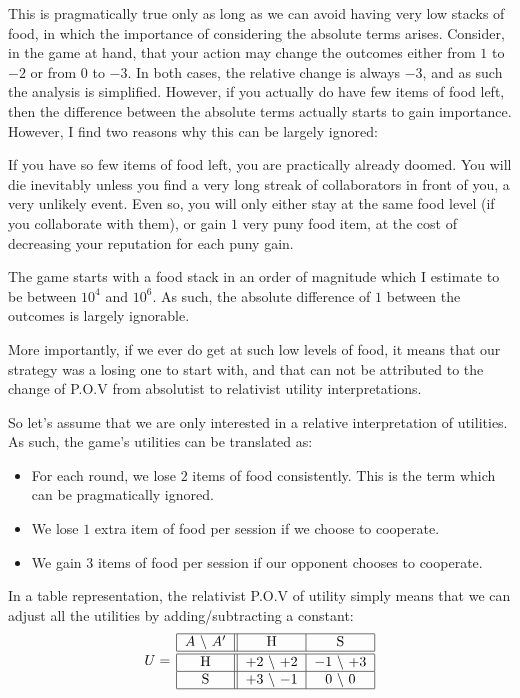 \documentclass[10pt,fleqn]{article}
\begin{document}
This is pragmatically true only as long as we can avoid having very low stacks
of food, in which the importance of considering the absolute terms arises.
Consider, in the game at hand, that your action may change the outcomes either
from $1$ to $-2$ or from $0$ to $-3$. In both cases, the relative change is
always $-3$, and as such the analysis is simplified. However, if you actually do
have few items of food left, then the difference between the absolute terms
actually starts to gain importance. However, I find two reasons why this can be
largely ignored:
\begin{inlist}
  \item If you have so few items of food left, you are practically already
  doomed. You will die inevitably unless you find a very long streak of
  collaborators in front of you, a very unlikely event. Even so, you will only
  either stay at the same food level (if you collaborate with them), or gain $1$
  very puny food item, at the cost of decreasing your reputation for each puny
  gain.
  \item The game starts with a food stack in an order of magnitude which I
  estimate to be between $10^4$ and $10^6$. As such, the absolute difference of
  $1$ between the outcomes is largely ignorable.
  \item More importantly, if we ever do get at such low levels of food, it means
  that our strategy was a losing one to start with, and that can not be
  attributed to the change of P.O.V from absolutist to relativist utility
  interpretations.
\end{inlist}

So let's assume that we are only interested in a relative interpretation of
utilities. As such, the game's utilities can be translated as:
\begin{itemize}
  \item For each round, we lose $2$ items of food consistently. This is the term
  which can be pragmatically ignored.
  \item We lose $1$ extra item of food per session if we choose to cooperate.
  \item We gain $3$ items of food per session if our opponent chooses to
  cooperate.
\end{itemize}

In a table representation, the relativist P.O.V of utility simply means that we
can adjust all the utilities by adding/subtracting a constant:
\begin{equation*}
  U =\,
    \begin{tabular}{|c||c|c|}
      \hline
      $A$ \textbackslash\ $A'$ & H & S \\
      \hline\hline
      H & $+2$ \textbackslash\ $+2$ & $-1$ \textbackslash\ $+3$ \\
      \hline
      S & $+3$ \textbackslash\ $-1$ & $0$ \textbackslash\ $0$ \\
      \hline
    \end{tabular}
\end{equation*}
\end{document}
